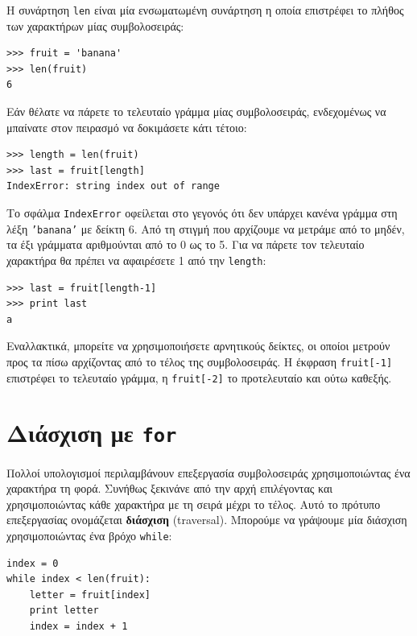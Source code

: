 \documentclass[10pt]{book}
\begin{document}
Η συνάρτηση {\tt len} είναι μία ενσωματωμένη συνάρτηση η οποία επιστρέφει
το πλήθος των χαρακτήρων μίας συμβολοσειράς:

\begin{verbatim}
>>> fruit = 'banana'
>>> len(fruit)
6
\end{verbatim}
%

Εάν θέλατε να πάρετε το τελευταίο γράμμα μίας συμβολοσειράς, ενδεχομένως να μπαίνατε στον πειρασμό να δοκιμάσετε κάτι τέτοιο:

\begin{verbatim}
>>> length = len(fruit)
>>> last = fruit[length]
IndexError: string index out of range
\end{verbatim}
%

Το σφάλμα {\tt IndexError} οφείλεται στο γεγονός ότι δεν υπάρχει κανένα γράμμα
στη λέξη {\tt 'banana'} με δείκτη 6. Από τη στιγμή που αρχίζουμε να μετράμε από το μηδέν, τα έξι γράμματα αριθμούνται από το 0 ως το 5. Για να πάρετε τον τελευταίο χαρακτήρα θα πρέπει να αφαιρέσετε 1 από την {\tt length}:

\begin{verbatim}
>>> last = fruit[length-1]
>>> print last
a
\end{verbatim}
%

Εναλλακτικά, μπορείτε να χρησιμοποιήσετε αρνητικούς δείκτες, οι οποίοι μετρούν προς τα πίσω αρχίζοντας από το τέλος της συμβολοσειράς. Η έκφραση {\tt fruit[-1]} επιστρέφει το τελευταίο γράμμα, η {\tt fruit[-2]} το προτελευταίο και ούτω καθεξής.


\section{Διάσχιση με {\tt for}}
\label{for}

Πολλοί υπολογισμοί περιλαμβάνουν επεξεργασία συμβολοσειράς χρησιμοποιώντας ένα χαρακτήρα τη φορά. Συνήθως ξεκινάνε από την αρχή επιλέγοντας και χρησιμοποιώντας κάθε χαρακτήρα με τη σειρά μέχρι το τέλος. Αυτό το πρότυπο επεξεργασίας ονομάζεται {\bf διάσχιση} (traversal). Μπορούμε να γράψουμε μία διάσχιση χρησιμοποιώντας ένα βρόχο {\tt while}:

\begin{verbatim}
index = 0
while index < len(fruit):
    letter = fruit[index]
    print letter
    index = index + 1
\end{verbatim}
%
\end{document}
